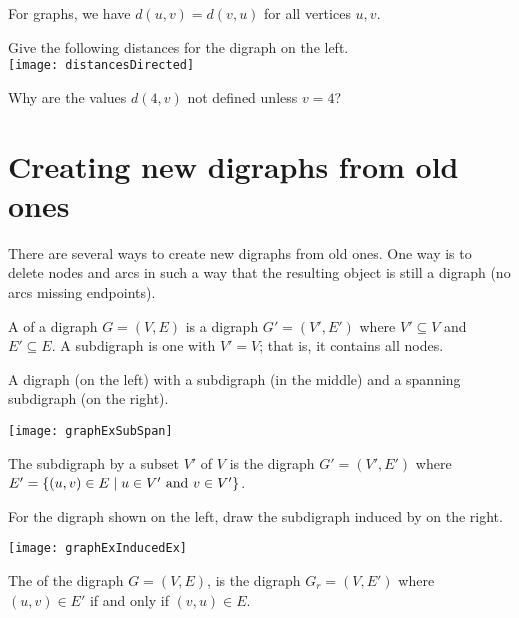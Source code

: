For graphs, we have $d(u,v) = d(v,u)$ for all vertices $u, v$. 

\begin{Boxample}[2]
Give the following distances for the digraph on the left.\\
\newline
\texttt{[image: distancesDirected]}
\newline

Why are the values $d(4, v)$ not defined unless $v = 4$?
\end{Boxample}

\section{Creating new digraphs from old ones}
There are several ways to create new digraphs from old ones.
One way is to delete nodes and arcs in such a way that the 
resulting object is still a digraph (no arcs missing endpoints).

\begin{Definition}
A  of a digraph $G = (V, E)$ is a digraph $G' = (V', E')$ 
where $V'\subseteq V$ and $E'\subseteq E$. 
A  subdigraph is one with $V' = V$; that is, it contains all nodes.
\end{Definition}

\begin{Boxample}
A digraph (on the left) with a subdigraph (in the middle) and a spanning subdigraph (on the right).
\begin{center}
\texttt{[image: graphExSubSpan]} 
\end{center}
\end{Boxample}

\begin{Definition}
The subdigraph  by a subset $V'$ of $V$ is the digraph
$G' = (V', E')$ where $E' = \mbox{$\{(u, v) \in E \mid u \in V' \mbox{ and } v\in V'\}$}$.
\end{Definition}

\begin{Boxample}
For the digraph shown on the left, draw the subdigraph induced by   on the right.
\begin{center}
\texttt{[image: graphExInducedEx]}
\end{center}
\end{Boxample}

\begin{Definition}
The  of the digraph $G = (V, E)$, is the digraph $G_r = (V, E')$ where $(u, v)\in E'$ if and only if $(v, u)\in E$.
\end{Definition}

